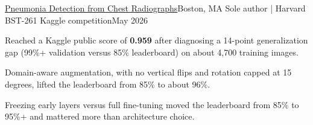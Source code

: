   \resumeSubheading
    {\href{https://github.com/JunyiZhou-Conny/BST-261-2026-Pneumonia-Chest-X-Ray-Classification}{Pneumonia Detection from Chest Radiographs}}{Boston, MA}
    {Sole author | Harvard BST-261 Kaggle competition}{May 2026}
    \resumeItemListStart
      \item Reached a Kaggle public score of \textbf{0.959} after diagnosing a 14-point generalization gap (99\%+ validation versus 85\% leaderboard) on about 4,700 training images.
      \item Domain-aware augmentation, with no vertical flips and rotation capped at 15 degrees, lifted the leaderboard from 85\% to about 96\%.
      \item Freezing early layers versus full fine-tuning moved the leaderboard from 85\% to 95\%+ and mattered more than architecture choice.
    \resumeItemListEnd

\resumeSubHeadingListEnd



